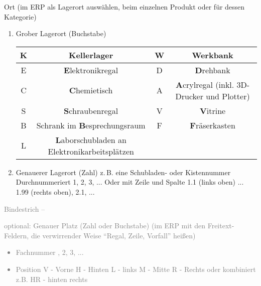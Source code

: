 \documentclass{\basedir/fablab-document}
\begin{document}
\begin{enumerate}
\item Ort (im ERP als Lagerort auswählen, beim einzelnen Produkt oder für dessen Kategorie)
\begin{enumerate}
\item Grober Lagerort (Buchstabe)
	
	\begin{tabular}{c|c|c|c}
	\hline
	K & \textbf{K}ellerlager & W & \textbf{W}erkbank \\
	\hline
	E & \textbf{E}lektronikregal & D & \textbf{D}rehbank \\
	\hline
	C & \textbf{C}hemietisch & A & \textbf{A}crylregal (inkl. 3D-Drucker und Plotter) \\
	\hline
	S & \textbf{S}chraubenregal & V & \textbf{V}itrine \\
	\hline
	B & Schrank im \textbf{B}esprechungsraum & F & \textbf{F}räserkasten \\
	\hline
	L & \textbf{L}aborschubladen an Elektronikarbeitsplätzen & & \\
	\hline
	\end{tabular}
\item Genauerer Lagerort (Zahl) \newline
	z.\,B. eine Schubladen- oder Kistennummer\newline
    Durchnummeriert 1, 2, 3, ...\newline
Oder mit Zeile und Spalte 1.1 (links oben) ... 1.99 (rechts oben), 2.1, ...
\end{enumerate}
\textcolor{gray}{
\item    Bindestrich --
\item   optional: Genauer Platz (Zahl oder Buchstabe) (im ERP mit den Freitext-Feldern, die verwirrender Weise \enquote{Regal, Zeile, Vorfall} heißen)
	\begin{itemize}
	\item Fachnummer , 2, 3, ...
	\item Position\newline
    V - Vorne\newline
    H - Hinten\newline
    L - links\newline
    M - Mitte\newline
    R - Rechts \newline
    oder kombiniert z.B. HR - hinten rechts\newline
	\end{itemize}
}
\end{enumerate}
\end{document}
